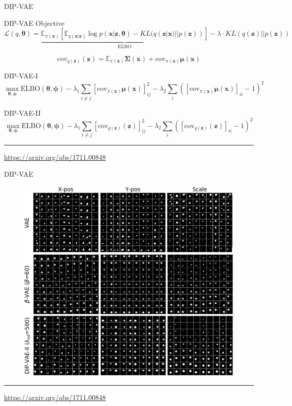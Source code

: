 \documentclass{beamer}
\newcommand{\bx}{\mathbf{x}}
\newcommand{\bz}{\mathbf{z}}
\newcommand{\bmu}{\boldsymbol{\mu}}
\newcommand{\bSigma}{\boldsymbol{\Sigma}}
\newcommand{\bbE}{\mathbb{E}}
\newcommand{\btheta}{\boldsymbol{\theta}}
\newcommand{\bphi}{\boldsymbol{\phi}}
\begin{document}
\begin{frame}{DIP-VAE}
	\begin{block}{DIP-VAE Objective}
		\vspace{-0.3cm}
		{\footnotesize
			\[
			\mathcal{L}(q, \btheta) = \underbrace{\bbE_{\pi(\bx)} \left[ \mathbb{E}_{q(\bz | \bx)} \log p(\bx | \bz, \btheta) - KL(q(\bz | \bx) || p(\bz)) \right]}_{\text{ELBO}} -\lambda \cdot KL(q(\bz) || p(\bz))
			\]
		}
		\vspace{-0.5cm}
	\end{block}
	\[
		\text{cov}_{q(\bz)}(\bz) = \bbE_{\pi(\bx)} \bSigma(\bx) + \text{cov}_{\pi(\bx)} \bmu(\bx)
	\]
	\vspace{-0.3cm}
	\begin{block}{DIP-VAE-I}
		\vspace{-0.3cm}
		\[
			\max_{\btheta, \bphi} \text{ELBO}(\btheta, \bphi) - \lambda_1 \sum_{i \neq j} \left[\text{cov}_{\pi(\bx)} \bmu(\bx)\right]^2_{ij} - \lambda_2 \sum_{i} \left( \left[ \text{cov}_{\pi(\bx)} \bmu(\bx) \right]_{ii} - 1 \right)^2
		\]
		\vspace{-0.3cm}
	\end{block}
	\begin{block}{DIP-VAE-II}
		\vspace{-0.3cm}
		\[
			\max_{\btheta, \bphi} \text{ELBO}(\btheta, \bphi) - \lambda_1 \sum_{i \neq j} \left[\text{cov}_{q(\bz)} (\bz) \right]^2_{ij} - \lambda_2 \sum_{i} \left( \left[ \text{cov}_{q(\bz)} (\bz) \right]_{ii} - 1 \right)^2
		\]
		\vspace{-0.3cm}
	\end{block}
	
	\vfill
	\hrule\medskip
	{\scriptsize \href{https://arxiv.org/abs/1711.00848}{https://arxiv.org/abs/1711.00848}}
\end{frame}
\begin{frame}{DIP-VAE}
	\begin{figure}
		\centering
		\includegraphics[width=0.8\linewidth]{figs/dip-vae_1}
	\end{figure}
	\vfill
	\hrule\medskip
	{\scriptsize \href{https://arxiv.org/abs/1711.00848}{https://arxiv.org/abs/1711.00848}}
\end{frame}
\end{document}
